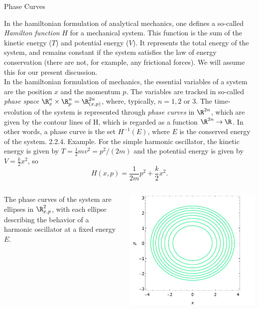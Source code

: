\documentclass[smaller,hyperref={CJKbookmarks=true}]{beamer}
\begin{document}
\begin{frame}{Phase Curves}
\begin{spacing}{1.05}
\vspace*{16pt}
In the hamiltonian formulation of analytical mechanics, one defines a
so-called \emph{Hamilton function} $H$ for a mechanical system. This function is
the sum of the kinetic energy ($T$) and potential energy ($V$). It represents
the total energy of the system, and remains constant if the system satisfies
the law of energy conservation (there are not, for example, any frictional
forces). We will assume this for our present discussion.\\[7pt]
In the hamiltonian formulation of mechanics, the essential variables of a
system are the position $x$ and the momentum $p$. The variables are tracked
in so-called \emph{phase space} $\R_{x}^{n}\times\R_{p}^{n}=\R_{(x,p)}^{2n}$, where, typically, $n=1,2$ or 3. The time-evolution of the system is represented through \emph{phase curves} in
$\R^{2n}$, which are given by the contour lines of H, which is regarded as a
function $\R^{2n}\to\R$. In other words, a phase curve is the set $H^{-1}(E)$, where
$E$ is the conserved energy of the system.
\newpage
\alert{2.2.4. Example.} For the simple harmonic oscillator, the kinetic energy is
given by $T=\frac{1}{2}mv^2=p^2/(2m)$ and the potential energy is given by $V=\frac{k}{2}x^2$, so
\[H(x,p)=\frac{1}{2m}p^2+\frac{k}{2}x^2.\]
\begin{columns}[c,onlytextwidth]
\begin{column}{0.6\textwidth}
The phase curves of the system are ellipses in $\R_{x,p}^2$, with each ellipse describing the behavior of a harmonic oscillator at a fixed energy $E$.
\end{column}
\begin{column}{0.4\textwidth}
\includegraphics[width=\columnwidth]{mt5.jpg}

\end{column}
\end{columns}
\end{spacing}
\end{frame}
\end{document}
